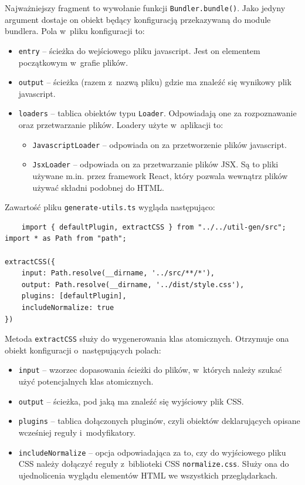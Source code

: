 \documentclass{SGGW-thesis}
\begin{document}
Najważniejszy fragment to wywołanie funkcji \verb|Bundler.bundle()|. Jako jedyny argument dostaje on obiekt będący konfiguracją przekazywaną do module bundlera. Pola w~pliku konfiguracji to:
\begin{itemize}
    \item \verb|entry| -- ścieżka do wejściowego pliku javascript. Jest on elementem początkowym w~grafie plików.
    \item \verb|output| -- ścieżka (razem z~nazwą pliku) gdzie ma znaleźć się wynikowy plik javascript.
    \item \verb|loaders| -- tablica obiektów typu \verb|Loader|. Odpowiadają one za rozpoznawanie oraz przetwarzanie plików. Loadery użyte w~aplikacji to:
    \begin{itemize}
        \item \verb|JavascriptLoader| -- odpowiada on za przetworzenie plików javascript.
        \item \verb|JsxLoader| -- odpowiada on za przetwarzanie plików JSX. Są to pliki używane m.in. przez framework React, który pozwala wewnątrz plików używać składni podobnej do HTML.
    \end{itemize}
\end{itemize}

Zawartość pliku \verb|generate-utils.ts| wygląda następująco:
\begin{verbatim}
    import { defaultPlugin, extractCSS } from "../../util-gen/src";
import * as Path from "path";

extractCSS({
	input: Path.resolve(__dirname, '../src/**/*'),
	output: Path.resolve(__dirname, '../dist/style.css'),
	plugins: [defaultPlugin],
	includeNormalize: true
})
\end{verbatim}

Metoda \verb|extractCSS| służy do wygenerowania klas atomicznych. Otrzymuje ona obiekt konfiguracji o~następujących polach:
\begin{itemize}
    \item \verb|input| -- wzorzec dopasowania ścieżki do plików, w~których należy szukać użyć potencjalnych klas atomicznych.
    \item \verb|output| -- ścieżka, pod jaką ma znaleźć się wyjściowy plik CSS.
    \item \verb|plugins| -- tablica dołączonych pluginów, czyli obiektów deklarujących opisane wcześniej reguły i~modyfikatory.
    \item \verb|includeNormalize| -- opcja odpowiadająca za to, czy do wyjściowego pliku CSS należy dołączyć reguły z~biblioteki CSS \verb|normalize.css|. Służy ona do ujednolicenia wyglądu elementów HTML we wszystkich przeglądarkach.
\end{itemize}
\end{document}
